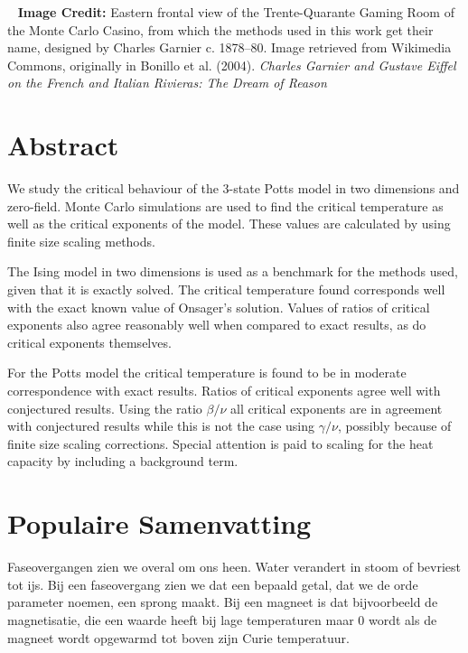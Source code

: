 \documentclass[11pt, a4paper]{report} %
\begin{document}
\thispagestyle{plain}

~
\vfill
\noindent
\textbf{Image Credit:} Eastern frontal view of the Trente-Quarante Gaming Room of the Monte Carlo Casino, from which the methods used in this work get their name, designed by Charles Garnier c. 1878–80. Image retrieved from Wikimedia Commons, originally in Bonillo et al. (2004). \textit{Charles Garnier and Gustave Eiffel on the French and Italian Rivieras: The Dream of Reason}


\newpage
\thispagestyle{plain}

\section*{Abstract}

We study the critical behaviour of the 3-state Potts model in two dimensions and zero-field.
Monte Carlo simulations are used to find the critical temperature as well as the critical exponents of the model.
These values are calculated by using finite size scaling methods.

The Ising model in two dimensions is used as a benchmark for the methods used, given that it is exactly solved.
The critical temperature found corresponds well with the exact known value of Onsager's solution.
Values of ratios of critical exponents also agree reasonably well when compared to exact results, as do critical exponents themselves.

For the Potts model the critical temperature is found to be in moderate correspondence with exact results.
Ratios of critical exponents agree well with conjectured results.
Using the ratio \(\beta/\nu\) all critical exponents are in agreement with conjectured results while this is not the case using \(\gamma/\nu\), possibly because of finite size scaling corrections.
Special attention is paid to scaling for the heat capacity by including a background term.

\section*{Populaire Samenvatting}
Faseovergangen zien we overal om ons heen. Water verandert in stoom of bevriest tot ijs.
Bij een faseovergang zien we dat een bepaald getal, dat we de orde parameter noemen, een sprong maakt.
Bij een magneet is dat bijvoorbeeld de magnetisatie, die een waarde heeft bij lage temperaturen maar 0 wordt als de magneet wordt opgewarmd tot boven zijn Curie temperatuur.
\end{document}
